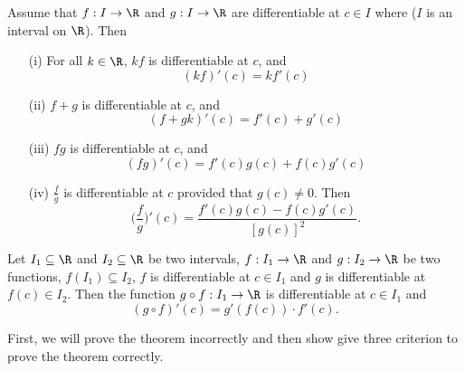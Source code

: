 \begin{theorem}
    Assume that \( f: I \to \R  \) and \( g : I \to \R  \) are differentiable at \( c \in I  \) where (\( I  \) is an interval on \( \R  \)). Then
    \begin{enumerate}
        \item[(i)] For all \( k \in \R  \), \( kf  \) is differentiable at \( c  \), and
            \[  (kf)'(c) = k f'(c) \]
        \item[(ii)] \( f+ g  \) is differentiable at \( c  \), and 
            \[  (f+gk)'(c) = f'(c) + g'(c) \]
        \item[(iii)] \( fg  \) is differentiable at \( c  \), and 
            \[  (fg)'(c) = f'(c) g(c) + f(c) g'(c) \]
        \item[(iv)] \( \frac{ f }{ g }  \) is differentiable at \( c  \) provided that \( g(c) \neq 0  \). Then
            \[  \Big(  \frac{ f }{ g }  \Big)' (c) = \frac{ f'(c) g(c) - f(c) g'(c) }{ [g(c)]^{2} }. \]
    \end{enumerate} 
\end{theorem}

\begin{theorem}
    Let \( {I}_{1} \subseteq  \R  \) and \( {I}_{2} \subseteq  \R   \) be two intervals, \( f: {I}_{1} \to \R  \) and \( g : {I}_{2} \to \R  \) be two functions, \( f({I}_{1}) \subseteq  {I}_{2} \), \( f \) is differentiable at \( c \in {I}_{1} \) and \( g  \) is differentiable at \( f(c) \in {I}_{2} \). Then the function \( g \circ f : {I}_{1} \to \R  \) is differentiable at \( c \in {I}_{1} \) and 
    \[  (g \circ f)'(c) = g'(f(c)) \cdot f'(c). \]
\end{theorem}
First, we will prove the theorem incorrectly and then show give three criterion to prove the theorem correctly.  

